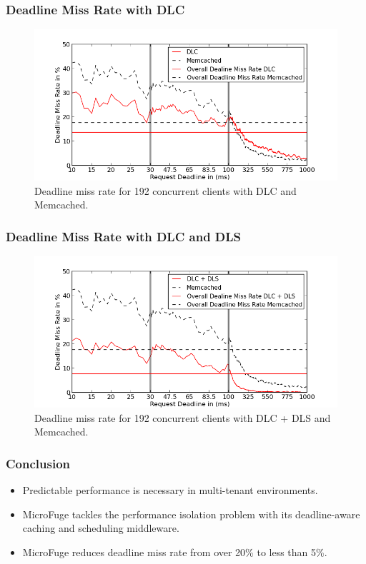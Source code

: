 \documentclass{beamer}
\newcommand{\myv}{\vspace{3 mm}}
\begin{document}
\begin{frame}
  \frametitle{Deadline Miss Rate with DLC}
  \begin{figure}[t]
    \begin{center}
      \centerline{\includegraphics[scale=0.5]{img/EC2/EC2_CS_MM/miss_48.png}}
      \caption{Deadline miss rate for 192 concurrent clients with DLC and Memcached.}
      \label{fig:miss_192_cs_mm}
    \end{center}
  \end{figure}
\end{frame}


\begin{frame}
  \frametitle{Deadline Miss Rate with DLC and DLS}
  \begin{figure}[t]
    \begin{center}
      \centerline{\includegraphics[scale=0.5]{img/EC2/EC2_SH_MM/miss_48.png}}
      \caption{Deadline miss rate for 192 concurrent clients with DLC + DLS and Memcached.}
      \label{fig:miss_192_sh_mm}
    \end{center}
  \end{figure}
\end{frame}


\begin{frame}
  \frametitle{Conclusion}
  \begin{itemize}
  \item Predictable performance is necessary in multi-tenant environments.
    \myv
  \item MicroFuge tackles the performance isolation problem with its
    deadline-aware caching and scheduling middleware.
    \myv
  \item MicroFuge reduces deadline miss rate from over 20\% to
    less than 5\%.
  \end{itemize}
\end{frame}
\end{document}
